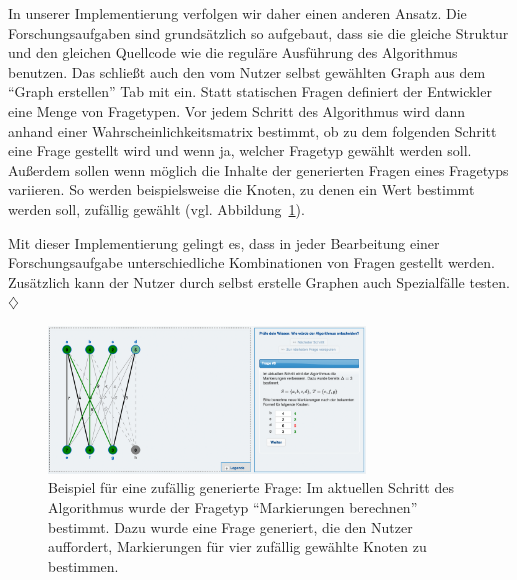 In unserer Implementierung verfolgen wir daher einen anderen Ansatz. Die Forschungsaufgaben sind grundsätzlich so aufgebaut, dass sie die gleiche Struktur und den gleichen Quellcode wie die reguläre Ausführung des Algorithmus benutzen. Das schließt auch den vom Nutzer selbst gewählten Graph aus dem \enquote{Graph erstellen} Tab mit ein. Statt statischen Fragen definiert der Entwickler eine Menge von Fragetypen. Vor jedem Schritt des Algorithmus wird dann anhand einer Wahrscheinlichkeitsmatrix bestimmt, ob zu dem folgenden Schritt eine Frage gestellt wird und wenn ja, welcher Fragetyp gewählt werden soll. Außerdem sollen wenn möglich die Inhalte der generierten Fragen eines Fragetyps variieren. So werden beispielsweise die Knoten, zu denen ein Wert bestimmt werden soll, zufällig gewählt (vgl. Abbildung~\ref{fig:random-question}).

Mit dieser Implementierung gelingt es, dass in jeder Bearbeitung einer Forschungsaufgabe unterschiedliche Kombinationen von Fragen gestellt werden. Zusätzlich kann der Nutzer durch selbst erstelle Graphen auch Spezialfälle testen. \hfill$\diamondsuit$

\begin{figure}[h!]
	\centering
	\includegraphics[width=0.75\textwidth]{figures/random_question}
	\caption[Zufällig generierte Frage]{Beispiel für eine zufällig generierte Frage: Im aktuellen Schritt des Algorithmus wurde der Fragetyp \enquote{Markierungen berechnen} bestimmt. Dazu wurde eine Frage generiert, die den Nutzer auffordert, Markierungen für vier zufällig gewählte Knoten zu bestimmen.}\label{fig:random-question}
\end{figure}

